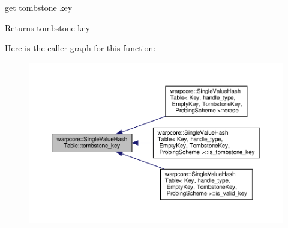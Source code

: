 get tombstone key 

\begin{DoxyReturn}{Returns}
tombstone key 
\end{DoxyReturn}
Here is the caller graph for this function\+:
\nopagebreak
\begin{figure}[H]
\begin{center}
\leavevmode
\includegraphics[width=350pt]{classwarpcore_1_1SingleValueHashTable_afd4fb9761ef0fd1a497a9cff5f5bd52e_icgraph}
\end{center}
\end{figure}
